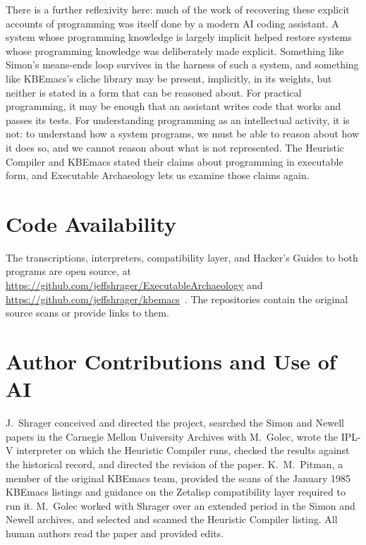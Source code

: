 \documentclass[11pt]{article}
\begin{document}
There is a further reflexivity here: much of the work of recovering
these explicit accounts of programming was itself done by a modern AI
coding assistant. A system whose programming knowledge is largely
implicit helped restore systems whose programming knowledge was
deliberately made explicit. Something like Simon's means-ends loop
survives in the harness of such a system, and something like KBEmacs's
cliche library may be present, implicitly, in its weights, but neither
is stated in a form that can be reasoned about. For practical
programming, it may be enough that an assistant writes code that works
and passes its tests. For understanding programming as an intellectual
activity, it is not: to understand how a system programs, we must be
able to reason about how it does so, and we cannot reason about what
is not represented. The Heuristic Compiler and KBEmacs stated their
claims about programming in executable form, and Executable
Archaeology lets us examine those claims again.

\section{Code Availability}
\label{sec:code}

The transcriptions, interpreters, compatibility layer, and Hacker's
Guides to both programs are open source, at
\url{https://github.com/jeffshrager/ExecutableArchaeology} and
\url{https://github.com/jeffshrager/kbemacs}~\cite{earepo,kbemacsrepo}. The
repositories contain the original source scans or provide links to
them.

\section*{Author Contributions and Use of AI}

J.~Shrager conceived and directed the project, searched the Simon and
Newell papers in the Carnegie Mellon University Archives with
M.~Golec, wrote the IPL-V interpreter on which the Heuristic Compiler
runs, checked the results against the historical record, and directed
the revision of the paper. K.~M.~Pitman, a member of the original KBEmacs team,
provided the scans of the January 1985 KBEmacs listings and guidance
on the Zetalisp compatibility layer required to run it. M.~Golec
worked with Shrager over an extended period in the Simon and Newell
archives, and selected and scanned the Heuristic Compiler listing. All
human authors read the paper and provided edits.
\end{document}
